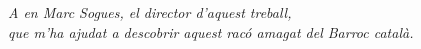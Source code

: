\thispagestyle{empty}
\begin{flushright}
{\small \itshape A en Marc Sogues, el director d'aquest treball, \\ que m'ha ajudat a descobrir aquest racó amagat del Barroc català.}
\end{flushright}
\cleardoublepage
\newpage
